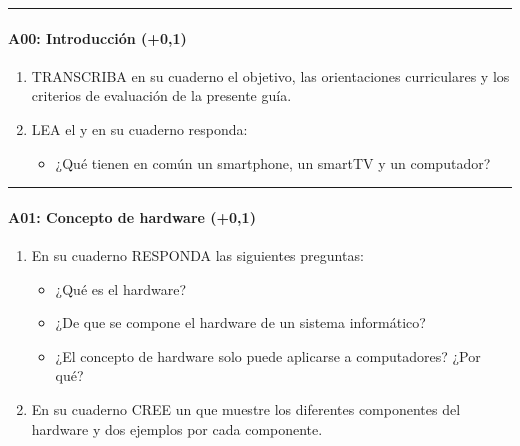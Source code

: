 \documentclass[letterpaper,10pt,spanish]{sphinxmanual}
\begin{document}
\bigskip\hrule\bigskip



\paragraph{A00: Introducción (+0,1)}
\label{\detokenize{cursos/logica8/periodo01/G01:a00-introduccion-0-1}}
\sphinxAtStartPar
{}
\begin{enumerate}
%
\item {} 
\sphinxAtStartPar
TRANSCRIBA en su cuaderno el objetivo, las orientaciones curriculares y los criterios de evaluación de la presente guía.

\item {} 
\sphinxAtStartPar
LEA el  y en su cuaderno responda:
\begin{itemize}
\item {} 
\sphinxAtStartPar
¿Qué tienen en común un smartphone, un smartTV y un computador?

\end{itemize}

\end{enumerate}


\bigskip\hrule\bigskip



\paragraph{A01: Concepto de hardware (+0,1)}
\label{\detokenize{cursos/logica8/periodo01/G01:a01-concepto-de-hardware-0-1}}
\sphinxAtStartPar
{}
\begin{enumerate}
%
\item {} 
\sphinxAtStartPar
En su cuaderno RESPONDA las siguientes preguntas:
\begin{itemize}
\item {} 
\sphinxAtStartPar
¿Qué es el hardware?

\item {} 
\sphinxAtStartPar
¿De que se compone el hardware de un sistema informático?

\item {} 
\sphinxAtStartPar
¿El concepto de hardware solo puede aplicarse a computadores? ¿Por qué?

\end{itemize}

\item {} 
\sphinxAtStartPar
En su cuaderno CREE un  que muestre los diferentes componentes del hardware y dos ejemplos por cada componente.

\end{enumerate}
\end{document}
